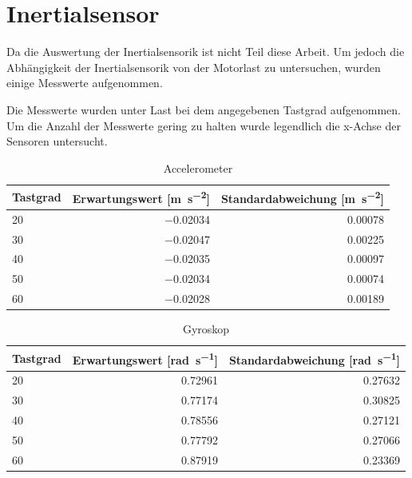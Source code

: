 \section{Inertialsensor}

Da die Auswertung der Inertialsensorik ist nicht Teil diese Arbeit. Um jedoch die Abhängigkeit der Inertialsensorik von der Motorlast
zu untersuchen, wurden einige Messwerte aufgenommen.

Die Messwerte wurden unter Last bei dem angegebenen Tastgrad aufgenommen. Um die Anzahl der Messwerte gering zu halten wurde legendlich die x-Achse der Sensoren untersucht.

\begin{table}[H]
  \centering
  \begin{tabularx}{\textwidth}{|X|r|r|}
    \hline
     Tastgrad & Erwartungswert [\si{\metre\per\second\squared}] & Standardabweichung [\si{\metre\per\second\squared}]  \\ \hline \hline
     20 & \num{-0,02034}  & \num{0,00078} \\ \hline
     30 & \num{-0,02047}  & \num{0,00225} \\ \hline
     40 & \num{-0,02035}  & \num{0,00097} \\ \hline
     50 & \num{-0,02034}  & \num{0,00074} \\ \hline
     60 & \num{-0,02028}  & \num{0,00189} \\ \hline
  \end{tabularx}
  \caption{Accelerometer}%
  \label{tab:acc}
\end{table}

\begin{table}[H]
  \centering
  \begin{tabularx}{\textwidth}{|X|r|r|}
    \hline
     Tastgrad & Erwartungswert [\si{\radian\per\second}] & Standardabweichung [\si{\radian\per\second}]  \\ \hline \hline
     20 & \num{0,72961} & \num{0,27632}\\ \hline
     30 & \num{0,77174} & \num{0,30825}\\ \hline
     40 & \num{0,78556} & \num{0,27121}\\ \hline
     50 & \num{0,77792} & \num{0,27066}\\ \hline
     60 & \num{0,87919} & \num{0,23369}\\ \hline
  \end{tabularx}
  \caption{Gyroskop}%
  \label{tab:gyro}
\end{table}



